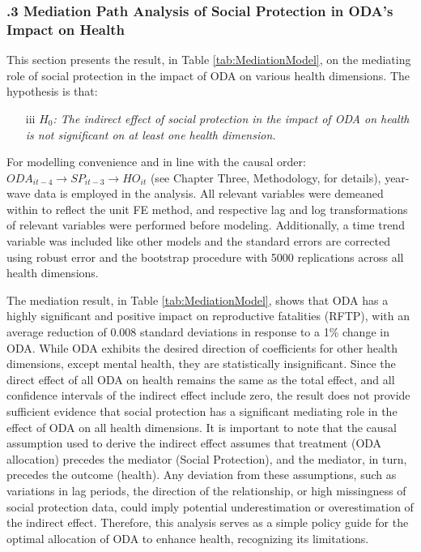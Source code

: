 \subsubsection*{.3 Mediation Path Analysis of Social Protection in ODA's Impact on Health}

This section presents the result, in Table \ref{tab:MediationModel}, on the mediating role of social protection in the impact of ODA on various health dimensions.
The hypothesis is that:
 \begin{enumerate}[i]
    \item[iii] \textit{$H_0$: The indirect effect of social protection in the impact of ODA on health is not significant on at least one health dimension.}
\end{enumerate} 
For modelling convenience and in line with the causal order: \(ODA_{it-4} \rightarrow SP_{it-3} \rightarrow HO_{it}\) (see Chapter Three, Methodology, for details), year-wave data is employed in the analysis. All relevant variables were demeaned within to reflect the unit FE method, and respective lag and log transformations of relevant variables were performed before modeling. Additionally, a time trend variable was included like other models and the standard errors are corrected using robust error and the bootstrap procedure with 5000 replications across all health dimensions.

The mediation result, in Table \ref{tab:MediationModel}, shows that ODA has a highly significant and positive impact on reproductive fatalities (RFTP), with an average reduction of 0.008 standard deviations in response to a 1\% change in ODA. While ODA exhibits the desired direction of coefficients for other health dimensions, except mental health, they are statistically insignificant. Since the direct effect of all ODA on health remains the same as the total effect, and all confidence intervals of the indirect effect include zero, the result does not provide sufficient evidence that social protection has a significant mediating role in the effect of ODA on all health dimensions. It is important to note that the causal assumption used to derive the indirect effect assumes that treatment (ODA allocation) precedes the mediator (Social Protection), and the mediator, in turn, precedes the outcome (health). Any deviation from these assumptions, such as variations in lag periods, the direction of the relationship, or high missingness of social protection data, could imply potential underestimation or overestimation of the indirect effect. Therefore, this analysis serves as a simple policy guide for the optimal allocation of ODA to enhance health, recognizing its limitations.

